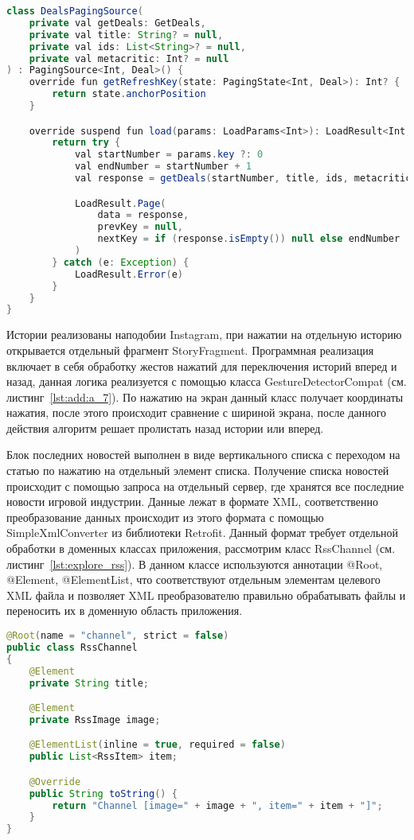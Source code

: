 \begin{lstlisting}[language=Java,label={lst:explore_paging_deals},caption={DealsPagingSource}]
class DealsPagingSource(
    private val getDeals: GetDeals,
    private val title: String? = null,
    private val ids: List<String>? = null,
    private val metacritic: Int? = null
) : PagingSource<Int, Deal>() {
    override fun getRefreshKey(state: PagingState<Int, Deal>): Int? {
        return state.anchorPosition
    }

    override suspend fun load(params: LoadParams<Int>): LoadResult<Int, Deal> {
        return try {
            val startNumber = params.key ?: 0
            val endNumber = startNumber + 1
            val response = getDeals(startNumber, title, ids, metacritic)

            LoadResult.Page(
                data = response,
                prevKey = null,
                nextKey = if (response.isEmpty()) null else endNumber
            )
        } catch (e: Exception) {
            LoadResult.Error(e)
        }
    }
}
\end{lstlisting}

Истории реализованы наподобии Instagram, при нажатии на отдельную историю открывается отдельный фрагмент StoryFragment. Программная реализация включает в себя обработку жестов нажатий для переключения историй вперед и назад, данная логика реализуется с помощью класса GestureDetectorCompat (см. листинг~\ref{lst:add:a_7}). По нажатию на экран данный класс получает координаты нажатия, после этого происходит сравнение с шириной экрана, после данного действия алгоритм решает пролистать назад истории или вперед.

Блок последних новостей выполнен в виде вертикального списка с переходом на статью по нажатию на отдельный элемент списка. Получение списка новостей происходит с помощью запроса на отдельный сервер, где хранятся все последние новости игровой индустрии. Данные лежат в формате XML, соответственно преобразование данных происходит из этого формата с помощью SimpleXmlConverter из библиотеки Retrofit. Данный формат требует отдельной обработки в доменных классах приложения, рассмотрим класс RssChannel (см. листинг~\ref{lst:explore_rss}). В данном классе используются аннотации @Root, @Element, @ElementList, что соответствуют отдельным элементам целевого XML файла и позволяет XML преобразователю правильно обрабатывать файлы и переносить их в доменную область приложения. 

\begin{lstlisting}[language=Java,label={lst:explore_rss},caption={RssChannel}]
@Root(name = "channel", strict = false)
public class RssChannel
{
    @Element
    private String title;

    @Element
    private RssImage image;

    @ElementList(inline = true, required = false)
    public List<RssItem> item;

    @Override
    public String toString() {
        return "Channel [image=" + image + ", item=" + item + "]";
    }
}
\end{lstlisting}

